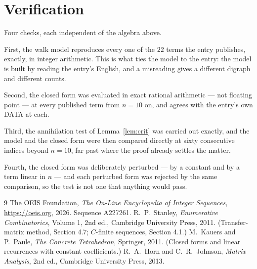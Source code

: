 \documentclass[11pt,a4paper]{article}
\theoremstyle{plain}
\theoremstyle{definition}
\begin{document}
\section{Verification}

Four checks, each independent of the algebra above.

First, the walk model reproduces every one of the $22$ terms the entry publishes,
exactly, in integer arithmetic. This is what ties the model to the entry: the model is built
by reading the entry's English, and a misreading gives a different digraph and different
counts.

Second, the closed form was evaluated in exact rational arithmetic --- not floating point ---
at every published term from $n=10$ on, and agrees with the entry's own DATA at each.

Third, the annihilation test of Lemma~\ref{lem:crit} was carried out exactly, and the model
and the closed form were then compared directly at sixty consecutive indices beyond
$n=10$, far past where the proof already settles the matter.

Fourth, the closed form was deliberately perturbed --- by a constant and by a term linear in
$n$ --- and each perturbed form was rejected by the same comparison, so the test is not one
that anything would pass.

\begin{thebibliography}{9}
 The OEIS Foundation, \emph{The On-Line Encyclopedia of Integer
Sequences}, \url{https://oeis.org}, 2026. Sequence A227261.
 R.~P.~Stanley, \emph{Enumerative Combinatorics}, Volume 1, 2nd ed.,
Cambridge University Press, 2011. (Transfer-matrix method, Section 4.7; $C$-finite sequences,
Section 4.1.)
 M.~Kauers and P.~Paule, \emph{The Concrete Tetrahedron}, Springer, 2011.
(Closed forms and linear recurrences with constant coefficients.)
 R.~A.~Horn and C.~R.~Johnson, \emph{Matrix Analysis}, 2nd ed., Cambridge
University Press, 2013.
\end{thebibliography}
\end{document}
